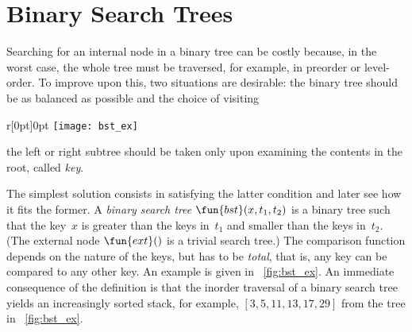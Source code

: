 \chapter{Binary Search Trees}

Searching for an internal node in a binary tree can be costly because,
in the worst case, the whole tree must be traversed, for example, in
preorder or level\hyp{}order. To improve upon this, two situations are
desirable: the binary tree should be as balanced as possible and the choice of visiting
\begin{wrapfigure}[7]{r}[0pt]{0pt}
\centering
\texttt{[image: bst\_ex]}
\caption{}
\label{fig:bst_ex}
\end{wrapfigure}
the left or right subtree should be taken only upon examining the
contents in the root, called \emph{key}.

The simplest solution consists in satisfying the latter condition and
later see how it fits the former. A \emph{binary search tree}
\citep{Mahmoud_1992} \(\fun{bst}(x, t_1,
t_2)\) is a binary tree such that the key~\(x\)
is greater than the keys in~\(t_1\) and smaller than the keys
in~\(t_2\). (The external node \(\fun{ext}()\) is a trivial search
tree.) The comparison function depends on the nature of the keys, but
has to be \emph{total}, that is, any key can be compared to any other
key. An example is given in \fig~\vref{fig:bst_ex}. An immediate
consequence of the definition is that the inorder traversal of a binary search tree yields an
increasingly sorted stack, for example, \([3,5,11,13,17,29]\) from the
tree in \fig~\ref{fig:bst_ex}.


